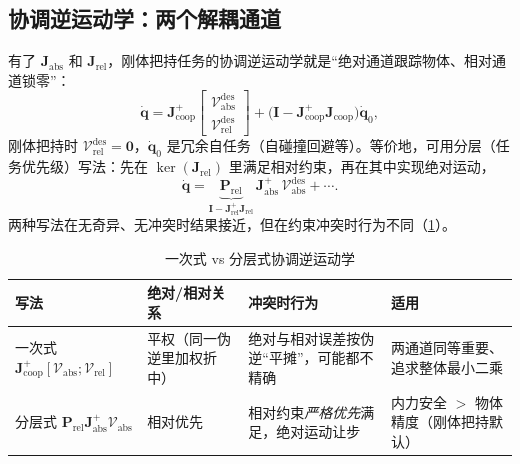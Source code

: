 \subsection{协调逆运动学：两个解耦通道}
\label{sec:ma-coopik}

有了 $\mathbf{J}_{\text{abs}}$ 和 $\mathbf{J}_{\text{rel}}$，刚体把持任务的协调逆运动学就是“绝对通道跟踪物体、相对通道锁零”：
\begin{equation}
  \dot{\mathbf{q}}=\mathbf{J}_{\text{coop}}^{+}\begin{bmatrix}\boldsymbol{\mathcal{V}}_{\text{abs}}^{\text{des}}\\ \boldsymbol{\mathcal{V}}_{\text{rel}}^{\text{des}}\end{bmatrix}
  +\big(\mathbf{I}-\mathbf{J}_{\text{coop}}^{+}\mathbf{J}_{\text{coop}}\big)\dot{\mathbf{q}}_0,
  \label{eq:ma-coopik}
\end{equation}
刚体把持时 $\boldsymbol{\mathcal{V}}_{\text{rel}}^{\text{des}}=\mathbf{0}$，$\dot{\mathbf{q}}_0$ 是冗余自任务（自碰撞回避等）。等价地，可用分层（任务优先级）写法：先在 $\ker(\mathbf{J}_{\text{rel}})$ 里满足相对约束，再在其中实现绝对运动，
\begin{equation}
  \dot{\mathbf{q}}=\underbrace{\mathbf{P}_{\text{rel}}}_{\mathbf{I}-\mathbf{J}_{\text{rel}}^{+}\mathbf{J}_{\text{rel}}}\,\mathbf{J}_{\text{abs}}^{+}\,\boldsymbol{\mathcal{V}}_{\text{abs}}^{\text{des}}+\cdots.
  \label{eq:ma-coopik-layered}
\end{equation}
两种写法在无奇异、无冲突时结果接近，但在约束冲突时行为不同（\cref{tab:ma-ik-choice}）。

\begin{table}[H]\centering\small
\caption{一次式 vs 分层式协调逆运动学}
\label{tab:ma-ik-choice}
\begin{tabular}{p{2.7cm}p{3.2cm}p{4.0cm}p{3.0cm}}
\toprule
写法 & 绝对/相对关系 & 冲突时行为 & 适用 \\
\midrule
一次式 $\mathbf{J}_{\text{coop}}^{+}[\boldsymbol{\mathcal{V}}_{\text{abs}};\boldsymbol{\mathcal{V}}_{\text{rel}}]$ & 平权（同一伪逆里加权折中） & 绝对与相对误差按伪逆“平摊”，可能都不精确 & 两通道同等重要、追求整体最小二乘 \\
分层式 $\mathbf{P}_{\text{rel}}\mathbf{J}_{\text{abs}}^{+}\boldsymbol{\mathcal{V}}_{\text{abs}}$ & 相对优先 & 相对约束\emph{严格优先}满足，绝对运动让步 & 内力安全 $>$ 物体精度（刚体把持默认） \\
\bottomrule
\end{tabular}
\end{table}

